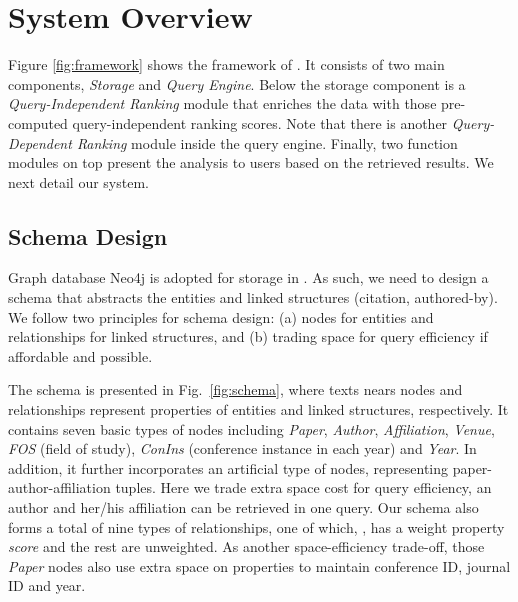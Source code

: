 \section{System Overview}
\label{sec-system}



Figure \ref{fig:framework} shows the framework of \oursystem. It consists of two main components, \ie \emph{Storage} and \emph{Query Engine}.
Below the storage component is a {\em Query-Independent Ranking} module that enriches the data with those pre-computed query-independent ranking scores. Note that there is another {\em Query-Dependent Ranking} module inside the query engine. Finally, two function modules on top present the analysis  to users based on the retrieved results. We next detail our system.

\subsection{Schema Design} \label{subsec:schema}

Graph database Neo4j is adopted for storage in \oursystem. As such, we need to design a schema that abstracts the entities and linked structures (\eg citation, authored-by).
We follow two principles for schema design: (a) nodes for entities and relationships for linked structures, and (b) trading space for query efficiency if affordable and possible.


The schema is presented in Fig.~\ref{fig:schema}, where texts nears nodes and relationships represent properties of entities and linked structures, respectively.
It contains seven basic types of nodes including {\em Paper}, {\em Author}, {\em Affiliation}, {\em Venue}, {\em FOS} (field of study), {\em ConIns} (conference instance in each year) and {\em Year}.
In addition, it further incorporates an artificial type of nodes,  representing paper-author-affiliation tuples. Here we trade extra space cost for query efficiency, \ie an author and her/his affiliation can be retrieved in one query.
%
Our schema also forms a total of nine types of relationships, one of which, , has a weight property {\em score} and the rest are unweighted.
As another space-efficiency trade-off, those {\em Paper} nodes also use extra space on properties to maintain conference ID, journal ID and year.



